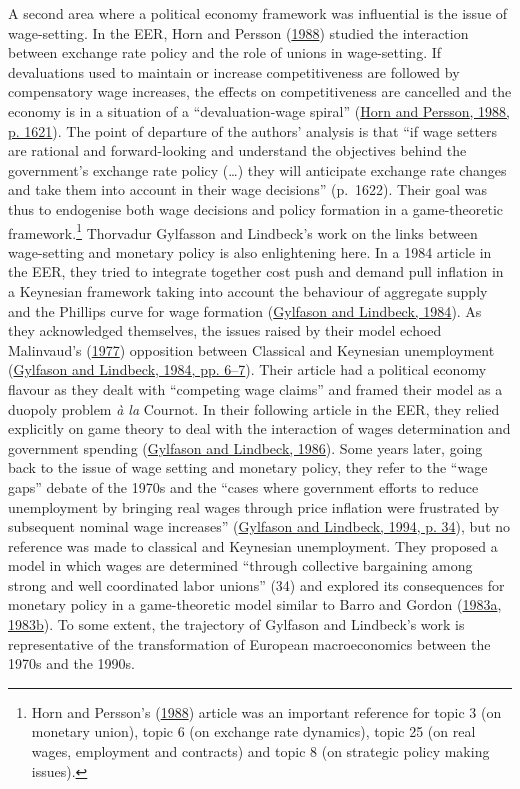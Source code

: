 \documentclass[
]{article}
\begin{document}
A second area where a political economy framework was influential is the
issue of wage-setting. In the EER, Horn and Persson
(\protect\hyperlink{ref-horn1988}{1988}) studied the interaction between
exchange rate policy and the role of unions in wage-setting. If
devaluations used to maintain or increase competitiveness are followed
by compensatory wage increases, the effects on competitiveness are
cancelled and the economy is in a situation of a ``devaluation-wage
spiral'' (\protect\hyperlink{ref-horn1988}{Horn and Persson, 1988, p.
1621}). The point of departure of the authors' analysis is that ``if
wage setters are rational and forward-looking and understand the
objectives behind the government's exchange rate policy (\ldots) they
will anticipate exchange rate changes and take them into account in
their wage decisions'' (p.~1622). Their goal was thus to endogenise both
wage decisions and policy formation in a game-theoretic
framework.\footnote{Horn and Persson's
  (\protect\hyperlink{ref-horn1988}{1988}) article was an important
  reference for topic 3 (on monetary union), topic 6 (on exchange rate
  dynamics), topic 25 (on real wages, employment and contracts) and
  topic 8 (on strategic policy making issues).} Thorvadur Gylfasson and
Lindbeck's work on the links between wage-setting and monetary policy is
also enlightening here. In a 1984 article in the EER, they tried to
integrate together cost push and demand pull inflation in a Keynesian
framework taking into account the behaviour of aggregate supply and the
Phillips curve for wage formation
(\protect\hyperlink{ref-gylfason1984}{Gylfason and Lindbeck, 1984}). As
they acknowledged themselves, the issues raised by their model echoed
Malinvaud's (\protect\hyperlink{ref-malinvaud1977}{1977}) opposition
between Classical and Keynesian unemployment
(\protect\hyperlink{ref-gylfason1984}{Gylfason and Lindbeck, 1984, pp.
6--7}). Their article had a political economy flavour as they dealt with
``competing wage claims'' and framed their model as a duopoly problem
\emph{à la} Cournot. In their following article in the EER, they relied
explicitly on game theory to deal with the interaction of wages
determination and government spending
(\protect\hyperlink{ref-gylfason1986}{Gylfason and Lindbeck, 1986}).
Some years later, going back to the issue of wage setting and monetary
policy, they refer to the ``wage gaps'' debate of the 1970s and the
``cases where government efforts to reduce unemployment by bringing real
wages through price inflation were frustrated by subsequent nominal wage
increases'' (\protect\hyperlink{ref-gylfason1994}{Gylfason and Lindbeck,
1994, p. 34}), but no reference was made to classical and Keynesian
unemployment. They proposed a model in which wages are determined
``through collective bargaining among strong and well coordinated labor
unions'' (34) and explored its consequences for monetary policy in a
game-theoretic model similar to Barro and Gordon
(\protect\hyperlink{ref-barro1983}{1983a},
\protect\hyperlink{ref-barro1983c}{1983b}). To some extent, the
trajectory of Gylfason and Lindbeck's work is representative of the
transformation of European macroeconomics between the 1970s and the
1990s.
\end{document}
